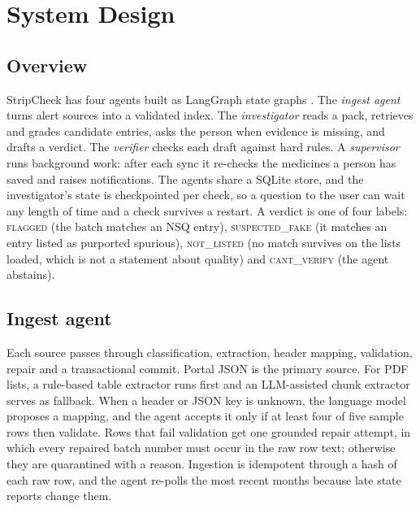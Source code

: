 \section{System Design}
\label{sec:system}


\subsection{Overview}
StripCheck has four agents built as LangGraph state graphs \cite{langchain2026interrupts,langchain2026persistence}. The \emph{ingest agent} turns alert sources into a validated index. The \emph{investigator} reads a pack, retrieves and grades candidate entries, asks the person when evidence is missing, and drafts a verdict. The \emph{verifier} checks each draft against hard rules. A \emph{supervisor} runs background work: after each sync it re-checks the medicines a person has saved and raises notifications. The agents share a SQLite store, and the investigator's state is checkpointed per check, so a question to the user can wait any length of time and a check survives a restart. A verdict is one of four labels: \textsc{flagged} (the batch matches an NSQ entry), \textsc{suspected\_fake} (it matches an entry listed as purported spurious), \textsc{not\_listed} (no match survives on the lists loaded, which is not a statement about quality) and \textsc{cant\_verify} (the agent abstains).

\subsection{Ingest agent}
Each source passes through classification, extraction, header mapping, validation, repair and a transactional commit. Portal JSON is the primary source. For PDF lists, a rule-based table extractor runs first and an LLM-assisted chunk extractor serves as fallback. When a header or JSON key is unknown, the language model proposes a mapping, and the agent accepts it only if at least four of five sample rows then validate. Rows that fail validation get one grounded repair attempt, in which every repaired batch number must occur in the raw row text; otherwise they are quarantined with a reason. Ingestion is idempotent through a hash of each raw row, and the agent re-polls the most recent months because late state reports change them.

